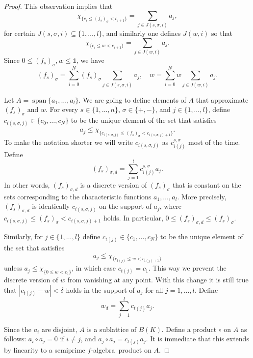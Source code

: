 \documentclass{memo-l}
\theoremstyle{definition}
\theoremstyle{remark}
\numberwithin{section}{chapter}
\numberwithin{equation}{chapter}
\newcommand{\one}{\ensuremath{\mathbb{1}}}
\newcommand{\falg}{$f\!$-algebra}
\DeclareMathOperator{\barespn}{span}
\begin{document}
\begin{proof}
    This observation implies that
    \[
    \chi _{\{c_i\le (f _s)_\sigma < c_{i+1}\}} = \sum_{j \in
    J(s,\sigma ,i)} a_j,
    \]
    for certain $J(s,\sigma ,i)\subseteq \{1,\ldots ,l\}$, and
    similarly one defines $J(w,i)$ so that
    \[
    \chi _{\{c_i\le w < c_{i+1}\}} = \sum_{j \in
    J(w,i)} a_j.
    \]
    Since $0\le (f_s)_\sigma ,w\le
    \one$,
    we have
    \[
        (f _s)_\sigma =\sum_{i=0}^{N} (f _s)_\sigma \sum_{j
        \in J(s,\sigma ,i)}^{} a_j, \quad w=\sum_{i=0}^{N} w \sum_{j
        \in J(w,i)}^{}a_j.
    \]

    Let $A=\barespn\{a_1,\ldots ,a_l\}$. We are going to define
    elements of $A$ that approximate $(f_s)_\sigma $ and $w$. For
    every $s \in \{1,\ldots ,n\}$, $\sigma \in \{+,-\}$, and $j \in \{1,\ldots
    ,l\}$, define $c_{i(s,\sigma,j)}\in \{c_0,\ldots ,c_{N}\}$ to be
    the unique element of the set that satisfies
    \[
        a_j \le \chi _{\{c_{i(s,\sigma,j)}\le (f_s)_\sigma
        <c_{i(s,\sigma ,j)+1}\}}.
    \]
    To make the notation shorter we will write $c_{i(s,\sigma ,j)}$ as
    $c_{i(j)}^{s,\sigma }$ most of the time. Define
    \[
    (f _s)_{\sigma ,d}=\sum_{j=1}^{l}c_{i(j)}^{s,\sigma
        }a_j.
    \]
    In other words, $(f_s)_{\sigma ,d}$ is a discrete version of
    $(f_s)_\sigma $ that is constant on the sets corresponding to the
    characteristic functions $a_1,\ldots ,a_l$. More precisely,
    $(f_s)_{\sigma ,d}$ is identically $c_{i(s,\sigma ,j)}$ on the
    support of $a_j$, where $c_{i(s,\sigma ,j)}\le (f_s)_\sigma
    <c_{i(s,\sigma ,j)+1}$ holds. In particular, $0\le (f_s)_{\sigma
    ,d}\le (f_s)_{\sigma }$.

    Similarly, for $j \in \{1,\ldots ,l\}$ define $c_{t(j)}\in
    \{c_1,\ldots ,c_N\}$ to be the unique element of the set that
    satisfies
    \[
        a_j \le \chi _{\{ c_{t(j)}\le w<c_{t(j)+1}\}}
    \]
    unless $a_j\le \chi _{\{0\le w<c_1\}}$, in which case
    $c_{t(j)}=c_1$. This way we prevent the discrete version of $w$
    from vanishing at any point. With this
    change it is still true that
    $|c_{t(j)}-w|<\delta $ holds in the support of $a_j$ for all
    $j=1,\ldots ,l$. Define
    \[
        w_d=\sum_{j=1}^{l} c_{t(j)} a_j.
    \]

    Since the $a_i$ are disjoint, $A$ is a sublattice of $B(K)$.
    Define a product $\circ$ on $A$ as follows: $a_i\circ
    a_j=0$ if $i\neq j$, and $a_j\circ a_j =c_{t(j)}a_j$. It is
    immediate that this extends by linearity to a semiprime \falg\ product on $A$.


\end{proof}
\end{document}
